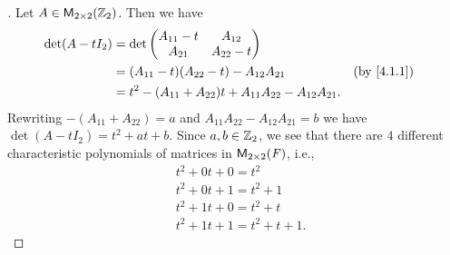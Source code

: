 \begin{proof}[]
	Let \(A \in \ms[2][2][\Z_2]\).
	Then we have
	\begin{align*}
		\det(A - t I_2) & = \det\begin{pmatrix}
			                        A_{1 1} - t & A_{1 2}     \\
			                        A_{2 1}     & A_{2 2} - t
		                        \end{pmatrix}                                                    \\
		                & = (A_{1 1} - t) (A_{2 2} - t) - A_{1 2} A_{2 1}                    &  & \by{4.1.1} \\
		                & = t^2 - (A_{1 1} + A_{2 2}) t + A_{1 1} A_{2 2} - A_{1 2} A_{2 1}.
	\end{align*}
	Rewriting \(-(A_{1 1} + A_{2 2}) = a\) and \(A_{1 1} A_{2 2} - A_{1 2} A_{2 1} = b\) we have \(\det(A - t I_2) = t^2 + at + b\).
	Since \(a, b \in \mathbb{Z}_2\), we see that there are \(4\) different characteristic polynomials of matrices in \(\ms[2][2][\F]\), i.e.,
	\begin{align*}
		 & t^2 + 0t + 0 = t^2          \\
		 & t^2 + 0t + 1 = t^2 + 1      \\
		 & t^2 + 1t + 0 = t^2 + t      \\
		 & t^2 + 1t + 1 = t^2 + t + 1.
	\end{align*}
\end{proof}
